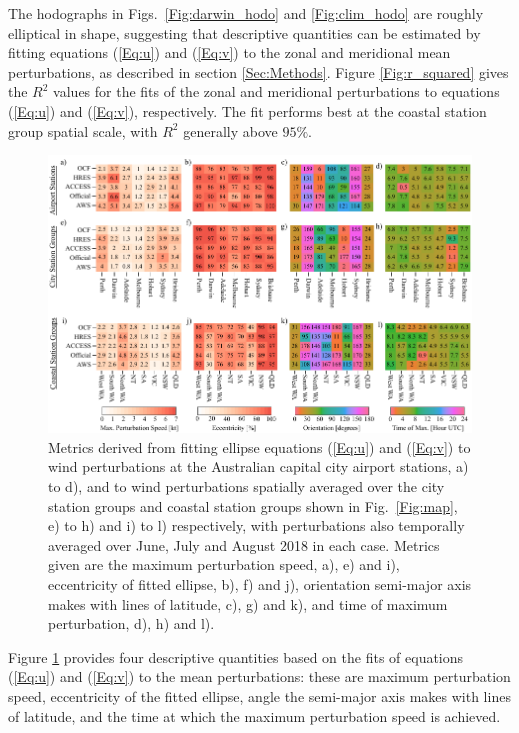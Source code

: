 \documentclass{ametsoc}
\begin{document}
The hodographs in Figs.~\ref{Fig:darwin_hodo} and \ref{Fig:clim_hodo} are roughly elliptical in shape, suggesting that descriptive quantities can be estimated by fitting equations (\ref{Eq:u}) and (\ref{Eq:v}) to the zonal and meridional mean perturbations, as described in section \ref{Sec:Methods}. Figure \ref{Fig:r_squared} gives the $R^2$ values for the fits of the zonal and meridional perturbations to equations (\ref{Eq:u}) and (\ref{Eq:v}), respectively. The fit performs best at the coastal station group spatial scale, with $R^2$ generally above $95\%$. 

\begin{figure}
\centering
\includegraphics[width=39pc]{ellipse_fits.pdf}
\caption{Metrics derived from fitting ellipse equations (\ref{Eq:u}) and (\ref{Eq:v}) to wind perturbations at the Australian capital city airport stations, a) to d), and to wind perturbations spatially averaged over the city station groups and coastal station groups shown in Fig.~\ref{Fig:map}, e) to h) and i) to l) respectively, with perturbations also temporally averaged over June, July and August 2018 in each case. Metrics given are the maximum perturbation speed, a), e) and i), eccentricity of fitted ellipse, b), f) and j), orientation semi-major axis makes with lines of latitude, c), g) and k), and time of maximum perturbation, d), h) and l).}
\label{Fig:ellipse_fits}
\end{figure}

Figure \ref{Fig:ellipse_fits} provides four descriptive quantities based on the fits of equations (\ref{Eq:u}) and (\ref{Eq:v}) to the mean perturbations: these are maximum perturbation speed, eccentricity of the fitted ellipse, angle the semi-major axis makes with lines of latitude, and the time at which the maximum perturbation speed is achieved.
\end{document}
